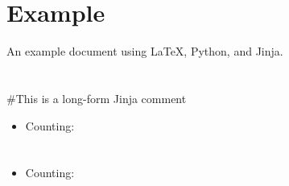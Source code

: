 \documentclass{article}
\begin{document}
\section{Example}
An example document using \LaTeX, Python, and Jinja.

\section{}
\#{This is a long-form Jinja comment}
\begin{itemize}
  \item Counting: 
\end{itemize}

\section{}
\begin{itemize}
  \item Counting: 
\end{itemize}
\end{document}
